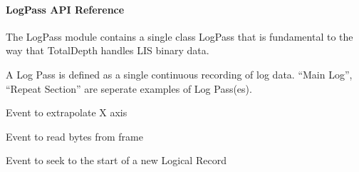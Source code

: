 \documentclass[letterpaper,10pt,english]{sphinxmanual}
\begin{document}
\begin{sphinxVerbatim}[commandchars=\\\{\}]
   
\end{sphinxVerbatim}


\paragraph{LogPass API Reference}
\label{\detokenize{ref/LIS/core/LogPass:module-TotalDepth.LIS.core.LogPass}}\label{\detokenize{ref/LIS/core/LogPass:logpass-api-reference}}
The LogPass module contains a single class LogPass that is fundamental to the
way that TotalDepth handles LIS binary data.

A Log Pass is defined as a single continuous recording of log data. “Main Log”,
“Repeat Section” are seperate examples of Log Pass(es).

\begin{fulllineitems}
\label{\detokenize{ref/LIS/core/LogPass:TotalDepth.LIS.core.LogPass.EVENT_EXTRAPOLATE}}
Event to extrapolate X axis

\end{fulllineitems}


\begin{fulllineitems}
\label{\detokenize{ref/LIS/core/LogPass:TotalDepth.LIS.core.LogPass.EVENT_READ}}
Event to read bytes from  frame

\end{fulllineitems}


\begin{fulllineitems}
\label{\detokenize{ref/LIS/core/LogPass:TotalDepth.LIS.core.LogPass.EVENT_SEEK_LR}}
Event to seek to the start of a new Logical Record

\end{fulllineitems}
\end{document}
